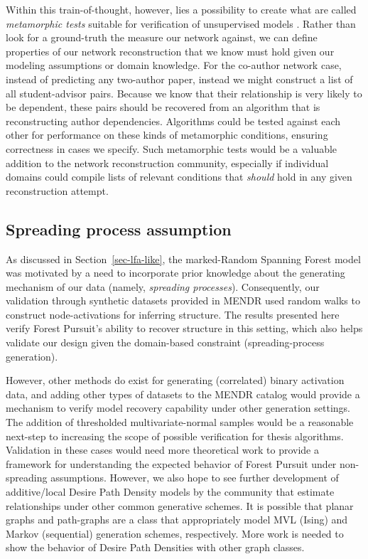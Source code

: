 \documentclass[%
	12pt,
		oneside,
		letterpaper
]{book}
\begin{document}
Within this train-of-thought, however, lies a possibility to create what
are called \emph{metamorphic tests} suitable for verification of
unsupervised models \autocite{METTLEMETamorphicTesting_Xie2020}. Rather
than look for a ground-truth the measure our network against, we can
define properties of our network reconstruction that we know must hold
given our modeling assumptions or domain knowledge. For the co-author
network case, instead of predicting any two-author paper, instead we
might construct a list of all student-advisor pairs. Because we know
that their relationship is very likely to be dependent, these pairs
should be recovered from an algorithm that is reconstructing author
dependencies. Algorithms could be tested against each other for
performance on these kinds of metamorphic conditions, ensuring
correctness in cases we specify. Such metamorphic tests would be a
valuable addition to the network reconstruction community, especially if
individual domains could compile lists of relevant conditions that
\emph{should} hold in any given reconstruction attempt.

\subsection{Spreading process
assumption}\label{spreading-process-assumption}

As discussed in Section~\ref{sec-lfa-like}, the marked-Random Spanning
Forest model was motivated by a need to incorporate prior knowledge
about the generating mechanism of our data (namely, \emph{spreading
processes}). Consequently, our validation through synthetic datasets
provided in MENDR used random walks to construct node-activations for
inferring structure. The results presented here verify Forest Pursuit's
ability to recover structure in this setting, which also helps validate
our design given the domain-based constraint (spreading-process
generation).

However, other methods do exist for generating (correlated) binary
activation data, and adding other types of datasets to the MENDR catalog
would provide a mechanism to verify model recovery capability under
other generation settings. The addition of thresholded
multivariate-normal samples
\autocite{generationcorrelatedartificial_Leisch1998} would be a
reasonable next-step to increasing the scope of possible verification
for thesis algorithms. Validation in these cases would need more
theoretical work to provide a framework for understanding the expected
behavior of Forest Pursuit under non-spreading assumptions. However, we
also hope to see further development of additive/local Desire Path
Density models by the community that estimate relationships under other
common generative schemes. It is possible that planar graphs and
path-graphs are a class that appropriately model MVL (Ising) and Markov
(sequential) generation schemes, respectively. More work is needed to
show the behavior of Desire Path Densities with other graph classes.
\end{document}
